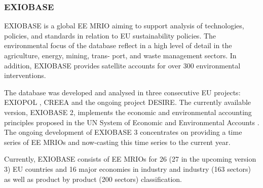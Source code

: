 \subsubsection{EXIOBASE}


EXIOBASE is a global EE MRIO aiming to support analysis of technologies,
policies, and standards in relation to EU sustainability policies. The
environmental focus of the database reflect in a high level of detail in the
agriculture, energy, mining, trans- port, and waste management sectors. In
addition, EXIOBASE provides satellite accounts for over 300 environmental
interventions.  

The database was developed and analysed in three consecutive EU projects: EXIOPOL \cite{Tukker_2013}, CREEA \cite{Wood_2014} and the ongoing project DESIRE. The currently available version, EXIOBASE 2, implements the
economic and environmental accounting principles proposed in the UN System of
Economic and Environmental Accounts \cite{european_commission._system_2014}.
The ongoing development of EXIOBASE 3 concentrates on providing a time series
of EE MRIOs and now-casting this time series to the current year. 

Currently, EXIOBASE consists of EE MRIOs for 26 (27 in the upcoming version 3) EU countries
and 16 major economies in industry and industry (163 sectors) as well as
product by product (200 sectors) classification.